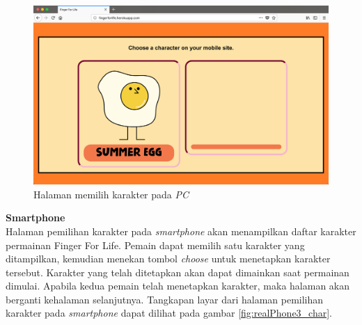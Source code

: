 \begin{enumerate}
	\begin{figure}[H]
		\centering
		\includegraphics[scale=0.25]{Gambar/realWeb3_char}
		\caption{Halaman memilih karakter pada \textit{PC}}
		\label{fig:realWeb3_char}
	\end{figure}
	
	\textbf{Smartphone} \\
	Halaman pemilihan karakter pada \textit{smartphone} akan menampilkan daftar karakter permainan Finger For Life. Pemain dapat memilih satu karakter yang ditampilkan, kemudian menekan tombol \textit{choose} untuk menetapkan karakter tersebut. Karakter yang telah ditetapkan akan dapat dimainkan saat permainan dimulai. Apabila kedua pemain telah menetapkan karakter, maka halaman akan berganti kehalaman selanjutnya. Tangkapan layar dari halaman pemilihan karakter pada \textit{smartphone} dapat dilihat pada gambar \ref{fig:realPhone3_char}.
	

\end{enumerate}
